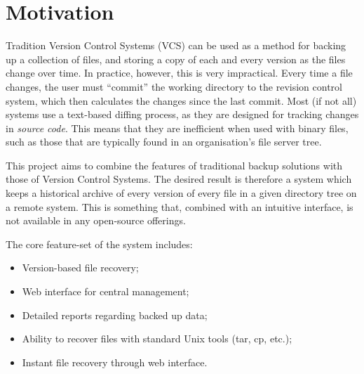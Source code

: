 \section{Motivation}

Tradition Version Control Systems (VCS) can be used as a method for backing up
a collection of files, and storing a copy of each and every version as the
files change over time. In practice, however, this is very impractical. Every
time a file changes, the user must ``commit'' the working directory to the
revision control system, which then calculates the changes since the last
commit. Most (if not all) systems use a text-based diffing process, as they are
designed for tracking changes in \emph{source code}. This means that they are
inefficient when used with binary files, such as those that are typically found
in an organisation's file server tree.

This project aims to combine the features of traditional backup solutions with
those of Version Control Systems. The desired result is therefore a system
which keeps a historical archive of every version of every file in a given
directory tree on a remote system. This is something that, combined with an
intuitive interface, is not available in any open-source offerings.

The core feature-set of the system includes:

\begin{itemize}
    \item Version-based file recovery;
    \item Web interface for central management;
    \item Detailed reports regarding backed up data;
    \item Ability to recover files with standard Unix tools (tar, cp, etc.);
    \item Instant file recovery through web interface.
\end{itemize}
